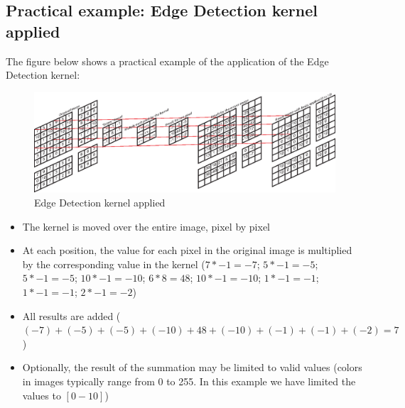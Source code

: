 \subsection{Practical example: Edge Detection kernel applied}
\label{sec:convolution:convolutionalfilters:practicalexampleedgedetectionkernelapplied}
The figure below shows a practical example of the application of the Edge Detection kernel:
\begin{figure}[h]
    \includegraphics[width=1.00\linewidth]{graphics/convolution/kernel.eps}
    \caption{Edge Detection kernel applied}
    \label{fig:edgedetectionkernelapplication}
\end{figure}
\FloatBarrier
\begin{itemize}
    \item The kernel is moved over the entire image, pixel by pixel
    \item At each position, the value for each pixel in the original image is multiplied by the corresponding value in the kernel ($7 * -1 = -7$; $5 * -1 = -5$; $5 * -1 = -5$; $10 * -1 = -10$; $6 * 8 = 48$; $10 * -1 = -10$; $1 * -1 = -1$; $1 * -1 = -1$; $2 * -1 = -2$)
    \item All results are added ($(-7) + (-5) + (-5) + (-10) + 48 + (-10) + (-1) + (-1) + (-2) = 7$)
    \item Optionally, the result of the summation may be limited to valid values (colors in images typically range from 0 to 255. In this example we have limited the values to $[0-10]$)
\end{itemize}
